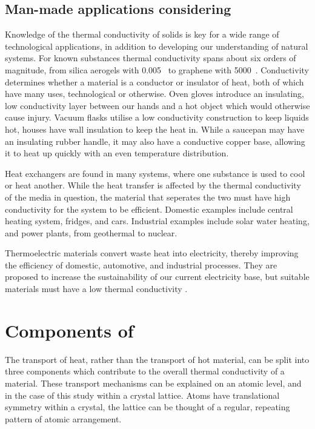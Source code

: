 \subsection{Man-made applications considering \tc}
Knowledge of the thermal conductivity of solids is key for a wide range of technological applications, in addition to developing our understanding of natural systems. For known substances thermal conductivity spans about six orders of magnitude, from silica aerogels with 0.005~\wmks \citep{Lee1995} to graphene with 5000~\wmks \citep{Balandin2008}. Conductivity determines whether a material is a conductor or insulator of heat, both of which have many uses, technological or otherwise. Oven gloves introduce an insulating, low conductivity layer between our hands and a hot object which would otherwise cause injury. Vacuum flasks utilise a low conductivity construction to keep liquids hot, houses have wall insulation to keep the heat in. While a saucepan may have an insulating rubber handle, it may also have a conductive copper base, allowing it to heat up quickly with an even temperature distribution.

Heat exchangers are found in many systems, where one substance is used to cool or heat another. While the heat transfer is affected by the thermal conductivity of the media in question, the material that seperates the two must have high conductivity for the system to be efficient. Domestic examples include central heating system, fridges, and cars. Industrial examples include solar water heating, and power plants, from geothermal to nuclear.

Thermoelectric materials convert waste heat into electricity, thereby improving the efficiency of domestic, automotive, and industrial processes. They are proposed to increase the sustainability of our current electricity base, but suitable materials must have a low thermal conductivity \citep{Snyder2008}.




\section{Components of \tc}


The transport of heat, rather than the transport of hot material, can be split into three components which contribute to the overall thermal conductivity of a material. These transport mechanisms can be explained on an atomic level, and in the case of this study within a crystal lattice. Atoms have translational symmetry within a crystal, the lattice can be thought of a regular, repeating pattern of atomic arrangement. 




